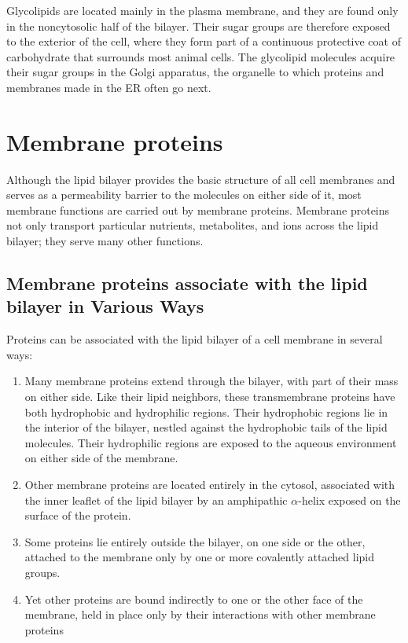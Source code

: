 Glycolipids are located mainly in the plasma membrane, and they are
found only in the noncytosolic half of the bilayer. Their sugar groups are
therefore exposed to the exterior of the cell, where they
form part of a continuous protective coat of carbohydrate that surrounds
most animal cells. The glycolipid molecules acquire their sugar groups
in the Golgi apparatus, the organelle to which proteins and membranes
made in the ER often go next.

\section{Membrane proteins}

Although the lipid bilayer provides the basic structure of all cell membranes 
and serves as a permeability barrier to the molecules on either
side of it, most membrane functions are carried out by membrane proteins.
Membrane proteins not only transport particular nutrients, metabolites,
and ions across the lipid bilayer; they serve many other functions.

\subsection{Membrane proteins associate with the lipid bilayer in Various Ways}

Proteins can be associated with the lipid bilayer of a cell membrane in
several ways:

\begin{enumerate}
\item Many membrane proteins extend through the bilayer, with part of
their mass on either side. Like their lipid neighbors, 
these transmembrane proteins have both hydrophobic and
hydrophilic regions. Their hydrophobic regions lie in the interior
of the bilayer, nestled against the hydrophobic tails of the lipid
molecules. Their hydrophilic regions are exposed to the aqueous
environment on either side of the membrane.
\item Other membrane proteins are located entirely in the cytosol, associated 
with the inner leaflet of the lipid bilayer by an amphipathic $\alpha$-helix exposed on the surface of the protein.
\item Some proteins lie entirely outside the bilayer, on one side or the
other, attached to the membrane only by one or more covalently
attached lipid groups.
\item Yet other proteins are bound indirectly to one or the other face of
the membrane, held in place only by their interactions with other
membrane proteins
\end{enumerate}

